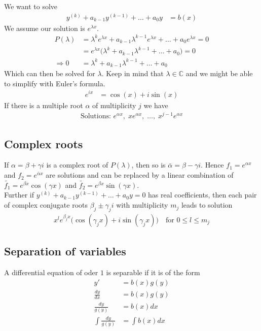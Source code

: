 \documentclass[8pt]{extarticle}
\newcommand{\C}{{\mathbb C}}
\def\C{\mathbb{C}}
\begin{document}
\begin{multicols*}{3}
  We want to solve
  \begin{align*}
    y^{(k)} + a_{k-1}y^{(k-1)} + \dots + a_0 y & = b(x)
  \end{align*}
  We assume our solution is $e^{\lambda x}$.
  \begin{align*}
    P(\lambda)    & = \lambda^k e^{\lambda x} + a_{k-1} \lambda^{k-1} e^{\lambda x} + \dots + a_0 e^{\lambda x} = 0 \\
                  & = e^{\lambda x} \Big( \lambda^k + a_{k-1}\lambda^{k-1} + \dots + a_0 \Big) = 0                  \\
    \Rightarrow 0 & = \lambda^k + a_{k-1}\lambda^{k-1} + \dots + a_0
  \end{align*}
  Which can then be solved for $\lambda$. Keep in mind that
  $\lambda \in \C$ and we might be able to simplify
  with Euler's formula.
  \begin{align*}
    e^{i x} & = \cos(x) + i \sin(x)
  \end{align*}
  If there is a multiple root $\alpha$ of multiplicity $j$ we have
  \begin{align*}
    \text{Solutions: }e^{\alpha x},\; x e^{\alpha x},\; \dots,\; x^{j-1} e^{\alpha x}
  \end{align*}
  \subsection{Complex roots}
  If $\alpha = \beta + \gamma i$ is a complex root of $P(\lambda)$, then so
  is $\bar{\alpha} = \beta - \gamma i$. Hence $f_1 = e^{\alpha x}$ and
  $f_2 = e^{\bar{\alpha} x}$ are solutions and can be replaced
  by a linear combination of $\tilde{f_1} = e^{\beta x} \cos(\gamma x)$
  and $\tilde{f_2} = e^{\beta x} \sin(\gamma x)$.\\
  Further if $y^{(k)} + a_{k-1}y^{(k-1)} + \dots + a_0 y = 0$ has
  real coefficients, then each pair of complex conjugate roots
  $\beta_j \pm \gamma_j i$ with multiplicity $m_j$ leads to
  solution
  \begin{align*}
    x^l e^{\beta_j x} \Big( \cos(\gamma_j x) + i \sin(\gamma_j x) \Big)
    \quad \text{for }0 \leq l \leq m_j
  \end{align*}
  \subsection{Separation of variables}
  A differential equation of oder $1$ is separable if it is of the
  form
  \begin{align*}
    y'                   & = b(x) g(y)    \\
    \frac{dy}{dx}        & = b(x) g(y)    \\
    \frac{dy}{g(y)}      & = b(x) dx      \\
    \int \frac{dy}{g(y)} & = \int b(x) dx 
  \end{align*}
\newpage{}

\end{multicols*}
\end{document}

